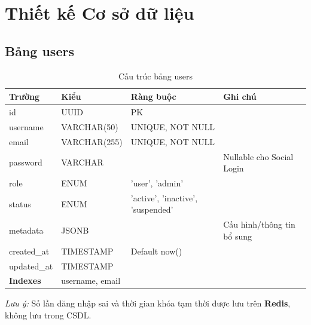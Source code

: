 \documentclass[12pt,a4paper]{article}
\begin{document}
\hrulefill

\section{Thiết kế Cơ sở dữ liệu}

\subsection{Bảng users}
\begin{longtable}{|l|l|l|p{5cm}|}
    \caption{Cấu trúc bảng users}                                                          \\
    \hline
    \rowcolor{headerblue}
    \textbf{Trường} & \textbf{Kiểu} & \textbf{Ràng buộc}                & \textbf{Ghi chú} \\
    \hline
    id              & UUID          & PK                                &                  \\
    \hline
    username        & VARCHAR(50)   & UNIQUE, NOT NULL                  &                  \\
    \hline
    email           & VARCHAR(255)  & UNIQUE, NOT NULL                  &                  \\
    \hline
    password        & VARCHAR       &                                   & Nullable cho Social Login \\
    \hline
    role            & ENUM          & 'user', 'admin'                   &                  \\
    \hline
    status          & ENUM          & 'active', 'inactive', 'suspended' &                  \\
    \hline
    metadata        & JSONB         &                                   & Cấu hình/thông tin bổ sung \\
    \hline
    created\_at     & TIMESTAMP     & Default now()                     &                  \\
    \hline
    updated\_at     & TIMESTAMP     &                                   &                  \\
    \hline
    \rowcolor{headerblue}
    \textbf{Indexes} & \multicolumn{3}{l|}{username, email}                                \\
    \hline
\end{longtable}

\textit{Lưu ý:} Số lần đăng nhập sai và thời gian khóa tạm thời được lưu trên \textbf{Redis}, không lưu trong CSDL.
\end{document}
